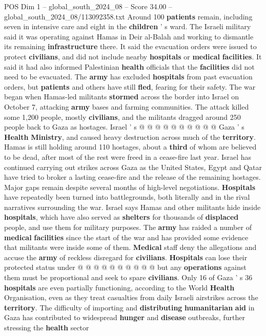 \begin{textsample}{POS Dim 1 – global\_south\_2024\_08 – Score 34.00 – global\_south\_2024\_08/113092358.txt}
Around 100 \textbf{patients} remain, including seven in intensive care and eight in the \textbf{children} ' s ward.
The Israeli military said it was operating against Hamas in Deir al-Balah and working to dismantle its remaining \textbf{infrastructure} there.
It said the evacuation orders were issued to protect \textbf{civilians}, and did not include nearby \textbf{hospitals} or \textbf{medical} \textbf{facilities}.
It said it had also informed Palestinian \textbf{health} officials that the \textbf{facilities} did not need to be evacuated.
The \textbf{army} has excluded \textbf{hospitals} from past evacuation orders, but \textbf{patients} and others have still \textbf{fled}, fearing for their safety.
The war began when Hamas-led militants \textbf{stormed} across the border into Israel on October 7, attacking \textbf{army} bases and farming communities.
The attack killed some 1,200 people, mostly \textbf{civilians}, and the militants dragged around 250 people back to Gaza as hostages.
Israel ' s @ @ @ @ @ @ @ @ @ @ Gaza ' s \textbf{Health} \textbf{Ministry}, and caused heavy destruction across much of the \textbf{territory}.
Hamas is still holding around 110 hostages, about a \textbf{third} of whom are believed to be dead, after most of the rest were freed in a cease-fire last year.
Israel has continued carrying out strikes across Gaza as the United States, Egypt and Qatar have tried to broker a lasting cease-fire and the release of the remaining hostages.
Major gaps remain despite several months of high-level negotiations. \textbf{Hospitals} have repeatedly been turned into battlegrounds, both literally and in the rival narratives surrounding the war.
Israel says Hamas and other militants hide inside \textbf{hospitals}, which have also served as \textbf{shelters} for thousands of \textbf{displaced} people, and use them for military purposes.
The \textbf{army} has raided a number of \textbf{medical} \textbf{facilities} since the start of the war and has provided some evidence that militants were inside some of them. \textbf{Medical} staff deny the allegations and accuse the \textbf{army} of reckless disregard for \textbf{civilians}. \textbf{Hospitals} can lose their protected status under @ @ @ @ @ @ @ @ @ @ but any \textbf{operations} against them must be proportional and seek to spare \textbf{civilians}.
Only 16 of Gaza ' s 36 \textbf{hospitals} are even partially functioning, according to the World \textbf{Health} Organisation, even as they treat casualties from daily Israeli airstrikes across the \textbf{territory}.
The difficulty of importing and \textbf{distributing} \textbf{humanitarian} \textbf{aid} in Gaza has contributed to widespread \textbf{hunger} and \textbf{disease} outbreaks, further stressing the \textbf{health} sector

\end{textsample}
